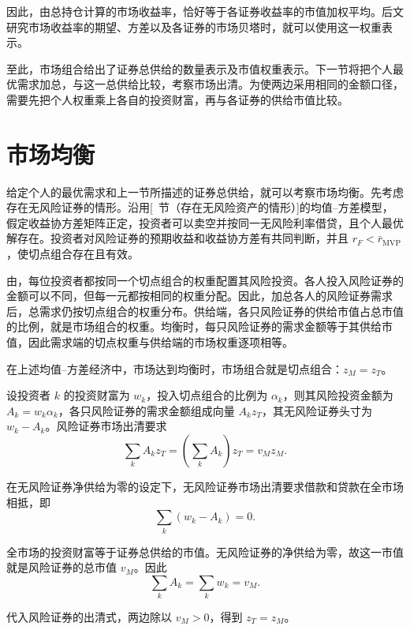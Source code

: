因此，由总持仓计算的市场收益率，恰好等于各证券收益率的市值加权平均。后文研究市场收益率的期望、方差以及各证券的市场贝塔时，就可以使用这一权重表示。

至此，市场组合给出了证券总供给的数量表示及市值权重表示。下一节将把个人最优需求加总，与这一总供给比较，考察市场出清。为使两边采用相同的金额口径，需要先把个人权重乘上各自的投资财富，再与各证券的供给市值比较。

\section{市场均衡}\label{sec:wj-thirteen-2}
给定个人的最优需求和上一节所描述的证券总供给，就可以考察市场均衡。先考虑存在无风险证券的情形。沿用[~节（存在无风险资产的情形）]的均值--方差模型，假定收益协方差矩阵正定，投资者可以卖空并按同一无风险利率借贷，且个人最优解存在。投资者对风险证券的预期收益和收益协方差有共同判断，并且 $r_F<\bar r_{\mathrm{MVP}}$，使切点组合存在且有效。

由，每位投资者都按同一个切点组合的权重配置其风险投资。各人投入风险证券的金额可以不同，但每一元都按相同的权重分配。因此，加总各人的风险证券需求后，总需求仍按切点组合的权重分布。供给端，各只风险证券的供给市值占总市值的比例，就是市场组合的权重。均衡时，每只风险证券的需求金额等于其供给市值，因此需求端的切点权重与供给端的市场权重逐项相等。

\begin{tcolorbox}[knowledge]
 在上述均值--方差经济中，市场达到均衡时，市场组合就是切点组合：$z_M=z_T$。
\end{tcolorbox}

\begin{solution}[label-content={证明},blank-type=none]
设投资者 $k$ 的投资财富为 $w_k$，投入切点组合的比例为 $\alpha_k$，则其风险投资金额为 $A_k=w_k\alpha_k$，各只风险证券的需求金额组成向量 $A_kz_T$，其无风险证券头寸为 $w_k-A_k$。风险证券市场出清要求
\[
 \sum_k A_kz_T=\left(\sum_k A_k\right)z_T=v_Mz_M.
\]

在无风险证券净供给为零的设定下，无风险证券市场出清要求借款和贷款在全市场相抵，即
\[
 \sum_k(w_k-A_k)=0.
\]

全市场的投资财富等于证券总供给的市值。无风险证券的净供给为零，故这一市值就是风险证券的总市值 $v_M$。因此
\[
 \sum_k A_k=\sum_k w_k=v_M.
\]

代入风险证券的出清式，两边除以 $v_M>0$，得到 $z_T=z_M$。
\end{solution}

